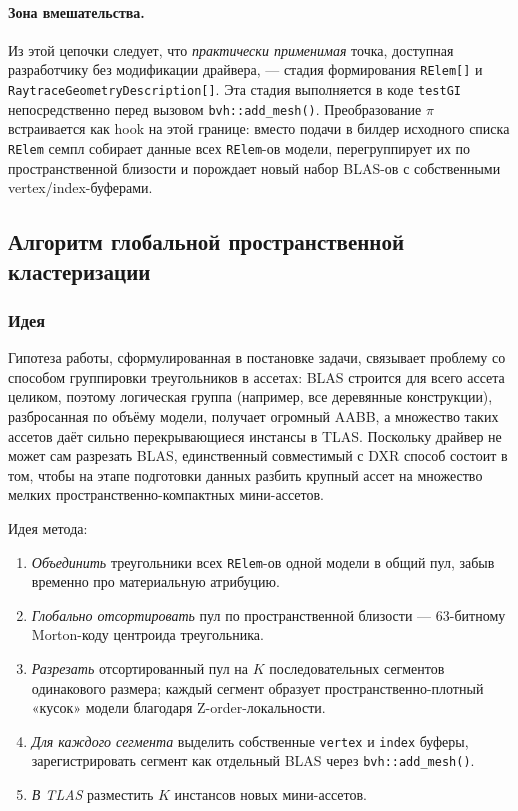 \paragraph{Зона вмешательства.} Из этой цепочки следует,
что \emph{практически применимая} точка, доступная разработчику без
модификации драйвера, --- стадия формирования
\texttt{RElem[]} и \texttt{RaytraceGeometryDescription[]}.
Эта стадия выполняется в коде \texttt{testGI} непосредственно
перед вызовом \texttt{bvh::add\_mesh()}. Преобразование $\pi$
встраивается как hook на этой границе: вместо подачи в билдер
исходного списка \texttt{RElem} семпл собирает данные всех
\texttt{RElem}-ов модели, перегруппирует их по пространственной
близости и порождает новый набор BLAS-ов с собственными
vertex/index-буферами.

\subsection{Алгоритм глобальной пространственной кластеризации}
\label{ssec:p2}

\subsubsection{Идея}

Гипотеза работы, сформулированная в постановке задачи, связывает проблему со
способом группировки треугольников в ассетах: BLAS строится для всего
ассета целиком, поэтому логическая группа (например, все деревянные
конструкции), разбросанная по объёму модели, получает огромный AABB, а
множество таких ассетов даёт сильно перекрывающиеся инстансы в TLAS.
Поскольку драйвер не может сам разрезать BLAS, единственный совместимый
с DXR способ состоит в том, чтобы на этапе подготовки данных разбить крупный ассет на
множество мелких пространственно-компактных мини-ассетов.

Идея метода:
\begin{enumerate}
    \item \emph{Объединить} треугольники всех \texttt{RElem}-ов
      одной модели в общий пул, забыв временно про
      материальную атрибуцию.
    \item \emph{Глобально отсортировать} пул по пространственной
      близости --- 63-битному Morton-коду центроида треугольника.
    \item \emph{Разрезать} отсортированный пул на $K$ последовательных
      сегментов одинакового размера; каждый сегмент образует
      пространственно-плотный «кусок» модели благодаря
      Z-order-локальности.
    \item \emph{Для каждого сегмента} выделить собственные
      \texttt{vertex} и \texttt{index} буферы, зарегистрировать
      сегмент как отдельный BLAS через
      \texttt{bvh::add\_mesh()}.
    \item \emph{В TLAS} разместить $K$ инстансов новых мини-ассетов.
\end{enumerate}

